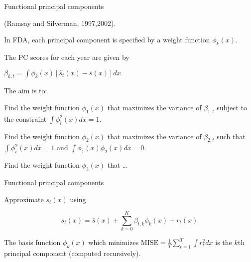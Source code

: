 \documentclass[14pt]{beamer}
\begin{document}
\begin{frame}{\large Functional principal components}


\textcolor[rgb]{1.00,0.50,0.00}{(Ramsay and Silverman,
1997,2002).}
\biz

\item In FDA, each principal component is specified by a weight
function $\phi_k(x)$.

\item The PC scores for each year are given by

\centerline{$\displaystyle \beta_{k,t} = \int \phi_k(x)
\left[\hat{s}_t(x) - \bar{s}(x)\right]dx$}

\item The aim is to:
\ben
\item Find the weight function $\phi_1(x)$ that maximizes the
variance of $\beta_{1,t}$ subject to the constraint $\int
\phi^2_i(x) dx = 1$.

\item Find the weight function $\phi_2(x)$ that maximizes the
variance of $\beta_{2,t}$ such that $\int \phi^2_i(x) dx = 1$ and
$\int\phi_1(x)\phi_2(x)dx = 0$.

\item Find the weight function $\phi_3(x)$ that \dots
\een
\eiz
\end{frame}
\begin{frame}{\large Functional principal components}
\vspace*{-0.3cm}


Approximate $s_t(x)$ using
\begin{block}{}
$$s_t(x) = \bar{s}(x) + \sum_{k=0}^{K} \beta_{t,k} \phi_k(x) + r_t(x)$$
\end{block}\pause


The basis function $\phi_k(x)$ which minimizes
$\displaystyle\mbox{MISE} = \frac1T \sum_{t=1}^T \int r_t^2 dx$
is the $k$th principal component (computed recursively).




\end{frame}
\end{document}
